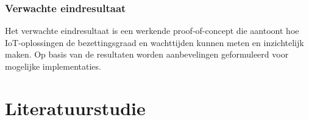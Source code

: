 \subsubsection*{Verwachte eindresultaat} 
Het verwachte eindresultaat is een werkende proof-of-concept die aantoont hoe IoT-oplossingen de bezettingsgraad en wachttijden kunnen meten en inzichtelijk maken. Op basis van de resultaten worden aanbevelingen geformuleerd voor mogelijke implementaties.



\section{Literatuurstudie}%
\label{sec:literatuurstudie}







